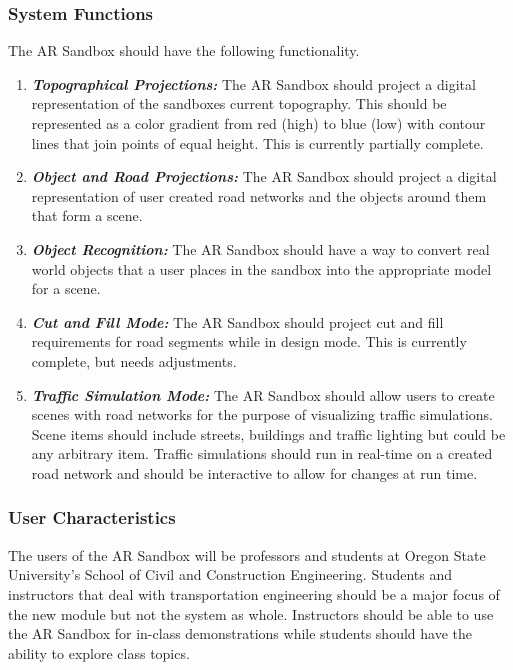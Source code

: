 \documentclass[letterpaper, 10pt, onecolumn, draftclsnofoot]{IEEEtran}
\begin{document}
        \subsubsection{\textbf{System Functions}}
        The AR Sandbox should have the following functionality.
        \begin{enumerate}[\label={}]
            \item {\textbf{\emph{Topographical Projections:}} The AR Sandbox should project a digital representation of the sandboxes current topography. This should be represented as a color gradient from red (high) to blue (low) with contour lines that join points of equal height. This is currently partially complete.}
            
            \item {\textbf{\emph{Object and Road Projections:}} The AR Sandbox should project a digital representation of user created road networks and the objects around them that form a scene.}
            
            \item {\textbf{\emph{Object Recognition:}} The AR Sandbox should have a way to convert real world objects that a user places in the sandbox into the appropriate model for a scene.}
            
            \item {\textbf{\emph{Cut and Fill Mode:}} The AR Sandbox should project cut and fill requirements for road segments while in design mode. This is currently complete, but needs adjustments.}

            \item {\textbf{\emph{Traffic Simulation Mode:}} The AR Sandbox should allow users to create scenes with road networks for the purpose of visualizing traffic simulations. Scene items should include streets, buildings and traffic lighting but could be any arbitrary item. Traffic simulations should run in real-time on a created road network and should be interactive to allow for changes at run time.}
        \end{enumerate}
        
        \subsubsection{\textbf{User Characteristics}}
        The users of the AR Sandbox will be professors and students at Oregon State University's School of Civil and Construction Engineering. Students and instructors that deal with transportation engineering should be a major focus of the new module but not the system as whole. Instructors should be able to use the AR Sandbox for in-class demonstrations while students should have the ability to explore class topics. 
        
\end{document}
